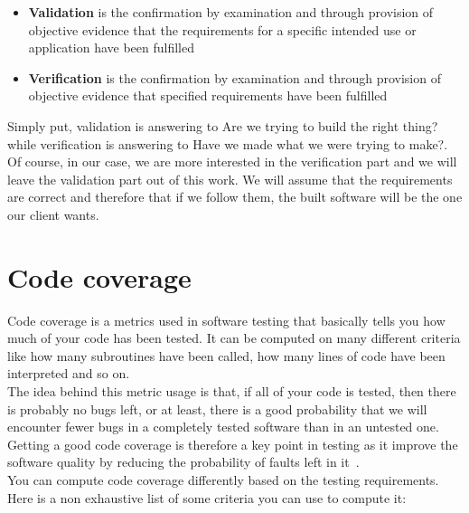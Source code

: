 \documentclass[12pt]{article}
\theoremstyle{definition}
\theoremstyle{definition}
\theoremstyle{remark}
\begin{document}
\begin{itemize}

\item \textbf{Validation} is the confirmation by examination and through provision of objective evidence that the requirements for a specific intended use or application have been fulfilled~\cite{IEEEStd1990}
\item \textbf{Verification} is the confirmation by examination and through provision of objective evidence that specified requirements have been fulfilled~\cite{IEEEStd1990}

\end{itemize}

Simply put, validation is answering to \guillemotleft Are we trying to build the right thing?\guillemotright while verification is answering to \guillemotleft Have we made what we were trying to make?\guillemotright. Of course, in our case, we are more interested in the verification part and we will leave the validation part out of this work. We will assume that the requirements are correct and therefore that if we follow them, the built software will be the one our client wants.



\section{Code coverage}


Code coverage is a metrics used in software testing that basically tells you how much of your code has been tested. It can be computed on many different criteria like how many subroutines have been called, how many lines of code have been interpreted and so on.\\

The idea behind this metric usage is that, if all of your code is tested, then there is probably no bugs left, or at least, there is a good probability that we will encounter fewer bugs in a completely tested software than in an untested one. Getting a good code coverage is therefore a key point in testing as it improve the software quality by reducing the probability of faults left in it~\cite{TestingForContinuousDelivery:2016}.\\

You can compute code coverage differently based on the testing requirements. Here is a non exhaustive list of some criteria you can use to compute it:
\end{document}
